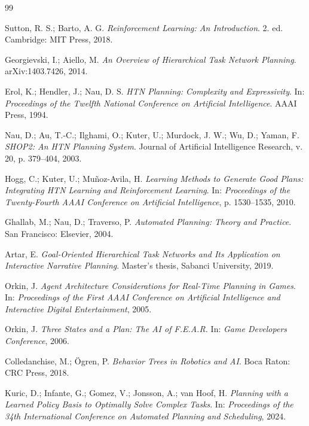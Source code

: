 

\begin{thebibliography}{99}

Sutton, R. S.; Barto, A. G.
\textit{Reinforcement Learning: An Introduction}.
2. ed. Cambridge: MIT Press, 2018.

Georgievski, I.; Aiello, M.
\textit{An Overview of Hierarchical Task Network Planning}.
arXiv:1403.7426, 2014.

Erol, K.; Hendler, J.; Nau, D. S.
\textit{HTN Planning: Complexity and Expressivity}.
In: \textit{Proceedings of the Twelfth National Conference on Artificial
Intelligence}. AAAI Press, 1994.

Nau, D.; Au, T.-C.; Ilghami, O.; Kuter, U.; Murdock, J. W.;
Wu, D.; Yaman, F.
\textit{SHOP2: An HTN Planning System}.
Journal of Artificial Intelligence Research, v. 20,
p. 379--404, 2003.

Hogg, C.; Kuter, U.; Muñoz-Avila, H.
\textit{Learning Methods to Generate Good Plans: Integrating HTN Learning and
Reinforcement Learning}.
In: \textit{Proceedings of the Twenty-Fourth AAAI Conference on Artificial
Intelligence}, p. 1530--1535, 2010.

Ghallab, M.; Nau, D.; Traverso, P.
\textit{Automated Planning: Theory and Practice}.
San Francisco: Elsevier, 2004.

Artar, E.
\textit{Goal-Oriented Hierarchical Task Networks and Its Application on
Interactive Narrative Planning}.
Master's thesis, Sabanci University, 2019.

Orkin, J.
\textit{Agent Architecture Considerations for Real-Time Planning in Games}.
In: \textit{Proceedings of the First AAAI Conference on Artificial
Intelligence and Interactive Digital Entertainment}, 2005.

Orkin, J.
\textit{Three States and a Plan: The AI of F.E.A.R.}
In: \textit{Game Developers Conference}, 2006.

Colledanchise, M.; Ögren, P.
\textit{Behavior Trees in Robotics and AI}.
Boca Raton: CRC Press, 2018.

Kuric, D.; Infante, G.; Gomez, V.; Jonsson, A.; van Hoof, H.
\textit{Planning with a Learned Policy Basis to Optimally Solve Complex Tasks}.
In: \textit{Proceedings of the 34th International Conference on Automated
Planning and Scheduling}, 2024.


\end{thebibliography}
